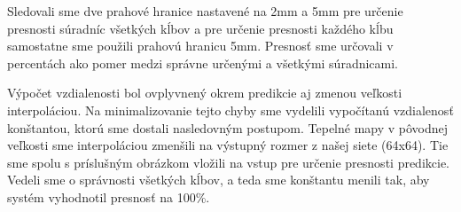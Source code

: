 Sledovali sme dve prahové hranice nastavené na 2mm a 5mm pre určenie presnosti súradníc všetkých kĺbov a pre určenie presnosti každého kĺbu samostatne sme použili prahovú hranicu 5mm. Presnosť sme určovali v percentách ako pomer medzi správne určenými a všetkými súradnicami. 

Výpočet vzdialenosti bol ovplyvnený okrem predikcie aj zmenou veľkosti interpoláciou. Na minimalizovanie tejto chyby sme vydelili vypočítanú vzdialenosť konštantou, ktorú sme dostali nasledovným postupom. Tepelné mapy v pôvodnej veľkosti sme interpoláciou zmenšili na výstupný rozmer z našej siete (64x64). Tie sme spolu s príslušným obrázkom vložili na vstup pre určenie presnosti predikcie. Vedeli sme o správnosti všetkých kĺbov, a teda sme konštantu menili tak, aby systém vyhodnotil presnosť na 100\%.